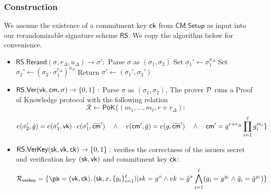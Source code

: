 \subsubsection{Construction}\label{threshold-ps-construction}
We assume the existence of a commitment key $\mathsf{ck}$ from $\mathsf{CM.Setup}$ as input into our rerandomizable signature scheme $\mathsf{RS}$. We copy the algorithm below for convenience.
\begin{itemize}
   
   
   
   
   
   
   
   
   
   
   
   
   
   
   
   
   \item $\mathsf{RS.Rerand}(\sigma, r_\Delta, u_\Delta) \to \sigma':$
        Parse $\sigma$ as $(\sigma_1, \sigma_2)$
        Set $\sigma_1' \gets \sigma_1^{u_\Delta}$
        Set $\sigma_2' \gets (\sigma_2 \cdot \sigma_1^{r_\Delta})^{u_\Delta}$
        Return $\sigma' \gets (\sigma_1', \sigma_2')$
    
    \item $\mathsf{RS.Ver}(\mathsf{vk}, \mathsf{cm}, \sigma) \to \{0,1\}:$
        Parse $\sigma$ as $(\sigma_1, \sigma_2)$, The prover $\mathcal{P}$ runs a Proof of Knowledge protocol with the following relation 
    \[
        \mathcal{R} \gets \mathsf{PoK}\{(m_1,\ldots,m_\ell, r + r_\Delta): 
    \]
    \[
         e(\sigma_2', \tilde{g}) = e(\sigma_1', \mathsf{vk})\cdot e(\sigma_1', \widetilde{\mathsf{cm}}') \quad \wedge \quad
        e(\mathsf{cm}', \tilde{g}) = e(g, \widetilde{\mathsf{cm}}') \quad \wedge \quad
        \mathsf{cm}' = g^{r + r_\Delta} \prod_{i=1}^\ell g_i^{m_i}
        \}
    \]

        \item $\mathsf{RS.VerKey}(\mathsf{sk}, \mathsf{vk}, \mathsf{ck}) \to \{0,1\}:$ verifies the correctness of the issuers secret and verification key $(\mathsf{sk}, \mathsf{vk})$ and commitment key $\mathsf{ck}$:
        \[
        \mathcal{R}_{\mathsf{verkey}} = \{\pk = (\vk, \ck),(\sk, x, \{y_i\}_{i=1}^\ell) | sk = g^x \wedge vk = \tilde{g}^x \bigwedge_{i=1}^\ell (g_i = g^{y_i} \wedge \tilde{g}_i = \tilde{g}^{y_i})\}
        \]
        
\end{itemize}

















